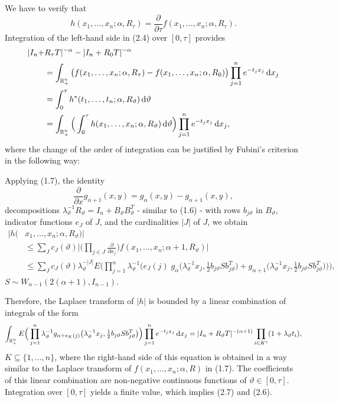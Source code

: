 \documentclass[12pt,twoside]{article}
\numberwithin{equation}{section}
\theoremstyle{plain}
\def\R{\mathbb{R}}
\def\d{\,{\rm{d}}}
\begin{document}
We have to verify that 
\begin{equation}
\label{2.6}
h(x_1,\ldots,x_n;\alpha,R_\tau) = \frac{\partial}{\partial\tau} f(x_1,\ldots,x_n;\alpha,R_\tau).
\end{equation}
Integration of the left-hand side in (2.4) over $[0,\tau]$ provides 
\begin{align}
\label{2.7}
|I_n+&R_\tau T|^{-\alpha} - |I_n+R_0 T|^{-\alpha} \nonumber \\
&= \int_{\R_+^n} \big(f(x_1,\ldots,x_n;\alpha,R_\tau) - f(x_1,\ldots,x_n;\alpha,R_0)\big) \prod_{j=1}^n e^{-t_j x_j} \d x_j \nonumber \\
&= \int_0^\tau h^*(t_1,\ldots,t_n;\alpha,R_\vartheta) \d\vartheta \nonumber \\
& = \int_{\R_+^n} \Big(\int_0^\tau h(x_1,\ldots,x_n;\alpha,R_\vartheta) \d\vartheta \Big) \prod_{j=1}^n e^{-t_j x_j} \d x_j,
\end{align}
where the change of the order of integration can be justified by Fubini's criterion in the following way:

Applying (1.7), the identity
$$
\frac{\partial}{\partial x}g_{\alpha+1}(x,y) = g_\alpha(x,y) - g_{\alpha+1}(x,y),
$$
decompositions $\lambda_\vartheta^{-1} R_\vartheta = I_n + B_\vartheta B_\vartheta^T$ - similar to (1.6) - with rows $b_{j\vartheta}$ in $B_\vartheta$, indicator functions $e_J$ of $J$,  and the cardinalities $|J|$ of $J$, we obtain 
\begin{align*}
|h(&x_1,\ldots,x_n;\alpha,R_\vartheta)| \\
& \le \sum_J c_J(\vartheta) \Big|\Big(\prod_{j \in J} \frac{\partial}{\partial x_j}\Big) f(x_1,\ldots,x_n;\alpha+1,R_\vartheta)\Big| \\
& \le \sum_J c_J(\vartheta) \lambda_\vartheta^{-|J|} E\Bigg(\prod_{j=1}^n \lambda_\vartheta^{-1} \Big(e_J(j) \; g_{\alpha}\big(\lambda_\vartheta^{-1} x_j,\tfrac12 b_{j\vartheta} Sb_{j\vartheta}^T\big) + g_{\alpha+1}\big(\lambda_\vartheta^{-1} x_j,\tfrac12 b_{j\vartheta} S b_{j\vartheta}^T\big)\Big)\Bigg),
\end{align*}
$S \sim W_{n-1}(2(\alpha+1),I_{n-1})$.  

Therefore, the Laplace transform of $|h|$ is bounded by a linear combination of integrals of the form
$$
\int_{\R_+^n} E\Big(\prod_{j=1}^n \lambda_\vartheta^{-1} g_{\alpha+e_K(j)}\big(\lambda_\vartheta^{-1} x_j,\tfrac12 b_{j\vartheta} Sb_{j\vartheta}^T\big)\Big) \prod_{j=1}^n e^{-t_j x_j} \d x_j = |I_n + R_\vartheta T|^{-(\alpha+1)} \prod_{i\in K^c} (1+\lambda_\vartheta t_i),
$$
$K \subseteq \{1,\ldots,n\}$, where the right-hand side of this equation is obtained in a way similar to the Laplace transform of $f(x_1,\ldots,x_n;\alpha,R)$ in (1.7).  The coefficients of this linear combination are non-negative continuous functions of $\vartheta \in [0,\tau]$. Integration over $[0,\tau]$ yields a finite value, which implies (2.7) and (2.6). 
\end{document}
